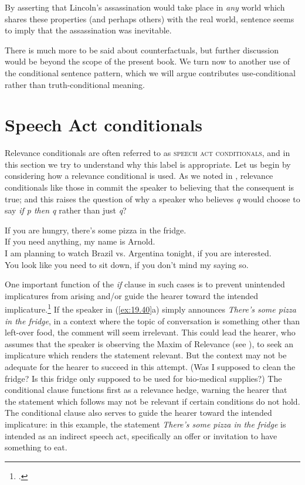 By asserting that Lincoln’s assassination would take place in \textit{any} world which shares these properties (and perhaps others) with the real world, sentence  seems to imply that the assassination was inevitable.



There is much more to be said about counterfactuals, but further discussion would be beyond the scope of the present book. We turn now to another use of the conditional sentence pattern, which we will argue contributes use-condi\-tion\-al rather than truth-conditional meaning.


\section{Speech Act conditionals}\label{sec:19.7}

Relevance conditionals are often referred to as \textsc{speech act conditionals}, and in this section we try to understand why this label is appropriate. Let us begin by considering how a relevance conditional is used. As we noted in , relevance conditionals like those in  commit the speaker to believing that the consequent is true; and this raises the question of why a speaker who believes \textit{q} would choose to say \textit{if p then q} rather than just \textit{q}?


\ea \label{ex:19.40}
\ea  If you are hungry, there’s some pizza in the fridge.\\
\ex If you need anything, my name is Arnold.\\
\ex I am planning to watch Brazil vs. Argentina tonight, if you are interested.\\
\ex You look like you need to sit down, if you don’t mind my saying so.
                       \z
\z


One important function of the \textit{if} clause in such cases is to prevent unintended implicatures from arising and/or guide the hearer toward the intended implicature.\footnote{\citet{DeRoseGrandy1999,Franke2007}.} If the speaker in (\ref{ex:19.40}a) simply announces \textit{There’s some pizza in the fridge}, in a context where the topic of conversation is something other than left-over food, the comment will seem irrelevant. This could lead the hearer, who assumes that the speaker is observing the Maxim of Relevance (see ), to seek an implicature which renders the statement relevant. But the context may not be adequate for the hearer to succeed in this attempt. (Was I supposed to clean the fridge? Is this fridge only supposed to be used for bio-medical supplies?) The conditional clause functions first as a relevance hedge, warning the hearer that the statement which follows may not be relevant if certain conditions do not hold. The conditional clause also serves to guide the hearer toward the intended implicature: in this example, the statement \textit{There’s some pizza in the fridge} is intended as an indirect speech act, specifically an offer or invitation to have something to eat.



